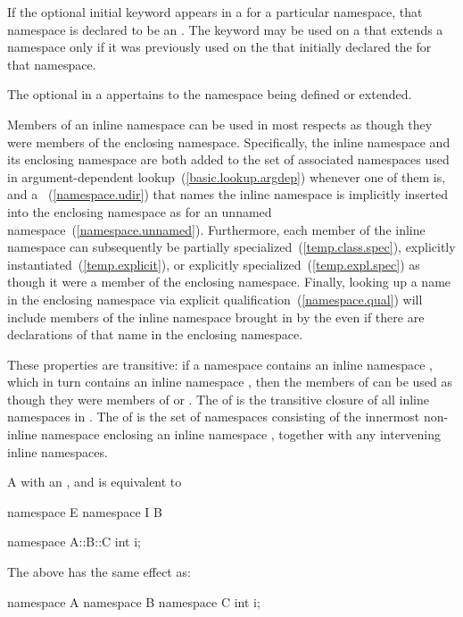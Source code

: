 \pnum
If the optional initial  keyword appears in a
 for a particular namespace, that namespace is
declared to be an . The  keyword may be
used on a  that extends a namespace
only if it was previously used on the  
that initially declared the  for that namespace.

\pnum
The optional 
in a 
appertains to the namespace being defined or extended.

\pnum
Members of an inline namespace can be used in most respects as though they were members
of the enclosing namespace. Specifically, the inline namespace and its enclosing
namespace are both added to the set of associated namespaces used in
argument-dependent lookup~(\ref{basic.lookup.argdep}) whenever one of them is,
and a ~(\ref{namespace.udir}) that names the inline
namespace is implicitly inserted into the enclosing namespace as for an unnamed
namespace~(\ref{namespace.unnamed}). Furthermore, each
member of the inline namespace can subsequently be partially
specialized~(\ref{temp.class.spec}), explicitly
instantiated~(\ref{temp.explicit}), or explicitly specialized~(\ref{temp.expl.spec}) as
though it were a member of the enclosing namespace. Finally, looking up a name in the
enclosing namespace via explicit qualification~(\ref{namespace.qual}) will include
members of the inline namespace brought in by the  even if
there are declarations of that name in the enclosing namespace.

\pnum
These properties are transitive: if a namespace  contains an inline namespace
, which in turn contains an inline namespace , then the members of
 can be used as though they were members of  or .
The  of  is the transitive closure of all
inline namespaces in .
The  of  is the set of namespaces
consisting of the innermost non-inline namespace enclosing
an inline namespace , together with any intervening inline namespaces.

\pnum
A  with an
 ,
  and
 
is equivalent to
\begin{codeblock}
namespace E { namespace I { B } }
\end{codeblock}
\begin{example}
\begin{codeblock}
namespace A::B::C {
  int i;
}
\end{codeblock}
The above has the same effect as:
\begin{codeblock}
namespace A {
  namespace B {
    namespace C {
      int i;
    }
  }
}
\end{codeblock}
\end{example}

